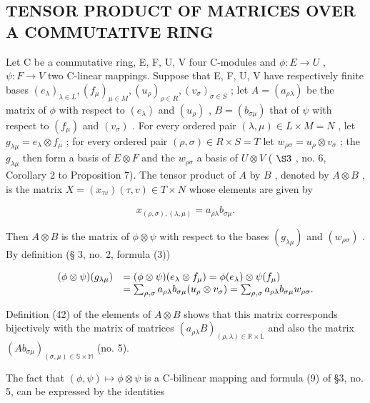 \subsection{TENSOR PRODUCT OF MATRICES OVER A COMMUTATIVE RING}

Let C be a commutative ring, E, F, U, V four C-modules and \(\phi:E\to U\) , \(\psi:F\to V\) two C-linear mappings. Suppose that E, F, U, V have respectively finite bases \((e_{\lambda})_{\lambda \in L}, (f_{\mu})_{\mu \in M}, (u_{\rho})_{\rho \in R}, (v_{\sigma})_{\sigma \in S}\) ; let \(A = (a_{\rho \lambda})\) be the matrix of \(\phi\) with respect to \((e_{\lambda})\) and \((u_{\rho})\) , \(B = (b_{\sigma \mu})\) that of \(\psi\) with respect to \((f_{\mu})\) and \((v_{\sigma})\) . For every ordered pair \((\lambda, \mu) \in L \times M = N\) , let \(g_{\lambda \mu} = e_{\lambda} \otimes f_{\mu}\) ; for every ordered pair \((\rho, \sigma) \in R \times S = T\) let \(w_{\rho \sigma} = u_{\rho} \otimes v_{\sigma}\) ; the \(g_{\lambda \mu}\) then form a basis of \(E \otimes F\) and the \(w_{\rho \sigma}\) a basis of \(U \otimes V\) ( \(\S 3\) , no. 6, Corollary 2 to Proposition 7). The tensor product of \(A\) by \(B\) , denoted by \(A \otimes B\) , is the matrix \(X = (x_{\tau v})(\tau, v) \in T \times N\) whose elements are given by

\[
x _ {(\rho , \sigma), (\lambda , \mu)} = a _ {\rho \lambda} b _ {\sigma \mu}.\tag{42}
\]

Then \(A \otimes B\) is the matrix of \(\phi \otimes \psi\) with respect to the bases \((g_{\lambda \mu})\) and \((w_{\rho \sigma})\) . By definition (§ 3, no. 2, formula (3))

\[
\begin{array}{r l} (\phi \otimes \psi) (g _ {\lambda \mu}) & = (\phi \otimes \psi) (e _ {\lambda} \otimes f _ {\mu}) = \phi (e _ {\lambda}) \otimes \psi (f _ {\mu}) \\ & = \sum_ {\rho , \sigma} a _ {\rho \lambda} b _ {\sigma \mu} (u _ {\rho} \otimes v _ {\sigma}) = \sum_ {\rho , \sigma} a _ {\rho \lambda} b _ {\sigma \mu} w _ {\rho \sigma}. \end{array}
\]

Definition (42) of the elements of \(A \otimes B\) shows that this matrix corresponds bijectively with the matrix of matrices \((a_{\rho \lambda}B)_{(\rho, \lambda) \in \mathbb{R} \times \mathbb{L}}\) and also the matrix \((Ab_{\sigma \mu})_{(\sigma, \mu) \in \mathbb{S} \times \mathbb{M}}\) (no. 5).

The fact that \((\phi, \psi) \mapsto \phi \otimes \psi\) is a C-bilinear mapping and formula (9) of §3, no. 5, can be expressed by the identities

